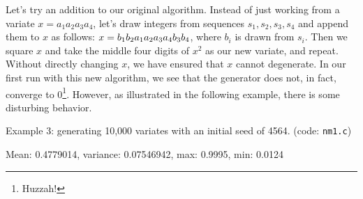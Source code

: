 \documentclass[11pt]{article}
\begin{document}
Let's try an addition to our original algorithm.  Instead of just working from a variate $x = a_1a_2a_3a_4$, let's draw integers from sequences $s_1, s_2, s_3, s_4$ and append them to $x$ as follows: $\\x=b_1b_2a_1a_2a_3a_4b_3b_4$, where $b_i$ is drawn from $s_i$.  Then we square $x$ and take the middle four digits of $x^2$ as our new variate, and repeat.  Without directly changing $x$, we have ensured that $x$ cannot degenerate.  In our first run with this new algorithm, we see that the generator does not, in fact, converge to 0\footnote{Huzzah!}.  However, as illustrated in the following example, there is some disturbing behavior.

\newpage

Example 3: generating 10,000 variates with an initial seed of 4564. (code: \texttt{nm1.c})

Mean: 0.4779014, variance: 0.07546942, max: 0.9995, min: 0.0124
\end{document}
